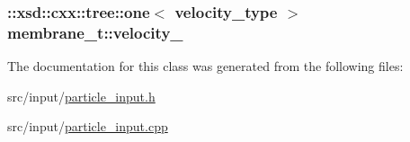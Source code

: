 \subsubsection[{\texorpdfstring{velocity\+\_\+}{velocity_}}]{\setlength{\rightskip}{0pt plus 5cm}\+::xsd\+::cxx\+::tree\+::one$<$ {\bf velocity\+\_\+type} $>$ membrane\+\_\+t\+::velocity\+\_\+\hspace{0.3cm}{\ttfamily [protected]}}\hypertarget{classmembrane__t_a22505f185660ba42d5fad386d6e1483e}{}\label{classmembrane__t_a22505f185660ba42d5fad386d6e1483e}


The documentation for this class was generated from the following files\+:\begin{DoxyCompactItemize}
\item 
src/input/\hyperlink{particle__input_8h}{particle\+\_\+input.\+h}\item 
src/input/\hyperlink{particle__input_8cpp}{particle\+\_\+input.\+cpp}\end{DoxyCompactItemize}
